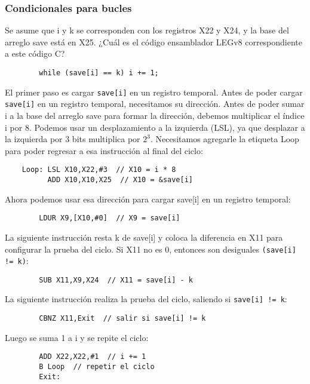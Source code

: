 \documentclass[aspectradio=43]{beamer}
\begin{document}
\begin{frame}[containsverbatim]
    \frametitle{Condicionales para bucles}
    Se asume que i y k se corresponden con los registros X22 y X24, y la base del arreglo save está en X25. ¿Cuál es el código ensamblador LEGv8 correspondiente a este código C?
    \begin{verbatim}
        while (save[i] == k) i += 1;
    \end{verbatim}
\end{frame}

\begin{frame}[containsverbatim]
    El primer paso es cargar \texttt{save[i]} en un registro temporal. Antes de poder cargar \texttt{save[i]} en un registro temporal, necesitamos su dirección. Antes de poder sumar i a la base del arreglo save para formar la dirección, debemos multiplicar el índice i por 8. Podemos usar un desplazamiento a la izquierda (LSL), ya que desplazar a la izquierda por 3 bits multiplica por $2^3$. Necesitamos agregarle la etiqueta Loop para poder regresar a esa instrucción al final del ciclo:
    \begin{verbatim}
    Loop: LSL X10,X22,#3  // X10 = i * 8
          ADD X10,X10,X25  // X10 = &save[i]
    \end{verbatim}
    Ahora podemos usar esa dirección para cargar save[i] en un registro temporal:
    \begin{verbatim}
        LDUR X9,[X10,#0]  // X9 = save[i]
    \end{verbatim}
\end{frame}

\begin{frame}[containsverbatim]
    La siguiente instrucción resta k de save[i] y coloca la diferencia en X11 para configurar la prueba del ciclo. Si X11 no es 0, entonces son desiguales \texttt{(save[i] != k)}:
    \begin{verbatim}
        SUB X11,X9,X24  // X11 = save[i] - k
    \end{verbatim}
    La siguiente instrucción realiza la prueba del ciclo, saliendo si \texttt{save[i] != k}:
    \begin{verbatim}
        CBNZ X11,Exit  // salir si save[i] != k
    \end{verbatim}
    Luego se suma 1 a i y se repite el ciclo:
    \begin{verbatim}
        ADD X22,X22,#1  // i += 1
        B Loop  // repetir el ciclo
        Exit:
    \end{verbatim}
\end{frame}
\end{document}
